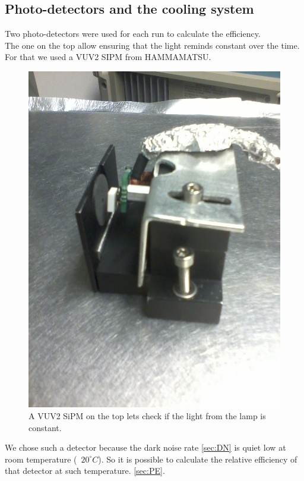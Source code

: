 \documentclass[a4paper, 11pt]{report}%
\begin{document}
  
  \subsection{Photo-detectors and the cooling system}
  
  Two photo-detectors were used for each run to calculate the efficiency.\\
  The one on the top allow ensuring that the light reminds constant over the time. For that we used a VUV2 SIPM from HAMMAMATSU.
  
  
  \begin{figure}[!hbtp] 
    \centering
    \includegraphics[totalheight=.35\textwidth,angle=270, trim=8cm 7cm 12cm 3.5cm, clip=true]{../Pictures/Pictures_Setup/VUV2_top.jpg}
    \caption{A VUV2 SiPM on the top lets check if the light from the lamp is constant.}
    \label{fig:top}
  \end{figure}
   
  We chose such a detector because the dark noise rate \ref{sec:DN} is quiet low at room temperature (~$20^{\circ}C$). So it is possible 
  to calculate the relative efficiency of that detector at such temperature. \ref{sec:PE}.
  \\
  
\end{document}
